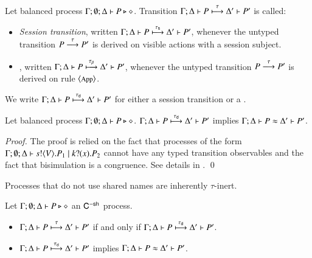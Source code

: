 \begin{definition}\rm
	Let balanced \HOp process $\Gamma; \emptyset; \Delta \vdash P \triangleright \diamond$.
	Transition $\Gamma; \Delta \vdash P \stackrel{\tau}{\longmapsto} \Delta' \vdash P'$ is called:
	\begin{itemize}
		\item	{\em Session transition}, written
			$\Gamma; \Delta \vdash P \stackrel{\tau_{\mathsf{s}}}{\longmapsto} \Delta' \vdash P'$,
			whenever the untyped transition $P \stackrel{\tau}{\longrightarrow} P'$
			is derived on visible actions with a session subject.

		\item	{\em \betatran}, written
			$\Gamma; \Delta \vdash P \stackrel{\tau_{\beta}}{\longmapsto} \Delta' \vdash P'$,
			whenever the untyped transition $P \stackrel{\tau}{\longrightarrow} P'$
			is derived on rule ${\footnotesize \langle \textrm{App} \rangle}$.
	\end{itemize}
%
	We write $\Gamma; \Delta \vdash P \stackrel{\tau_{\mathsf{d}}}{\longmapsto} \Delta' \vdash P'$ for
	either a session transition or a \betatran.
\end{definition}

\begin{proposition}\rm
	\label{lem:tau_inert}
	Let balanced \HOp process $\Gamma; \emptyset; \Delta \vdash P \triangleright \diamond$.
	$\Gamma; \Delta \vdash P \stackrel{\tau_{\mathsf{d}}}{\longmapsto} \Delta' \vdash P'$ implies
	$\Gamma; \Delta \vdash P \approx \Delta' \vdash P'$.
\end{proposition}

\begin{proof}
	The proof is relied on the fact that processes of the
	form $\Gamma; \emptyset; \Delta \vdash s ! \langle V \rangle . P_1 \;|\; k ? (x) . P_2$
	cannot have any typed transition observables and the fact
	that bisimulation is a congruence.
	See details in .
	\qed
\end{proof}

Processes that do not use shared names are inherently $\tau$-inert.

\begin{corollary}\rm
	\label{cor:tau_inert}
	Let $\Gamma; \emptyset; \Delta \vdash P \triangleright \diamond$ an $\mathsf{C}^{\mathsf{-sh}}$ process.
%
	\begin{itemize}
		\item	$\Gamma; \Delta \vdash P \stackrel{\tau}{\longmapsto} \Delta' \vdash P'$ if and only if $\Gamma; \Delta \vdash P \stackrel{\tau_{\mathsf{d}}}{\longmapsto} \Delta' \vdash P'$.
		\item	$\Gamma; \Delta \vdash P \stackrel{\tau_{\mathsf{d}}}{\longmapsto} \Delta' \vdash P'$ implies $\Gamma; \Delta \vdash P \approx \Delta' \vdash P'$.
	\end{itemize}
\end{corollary}

